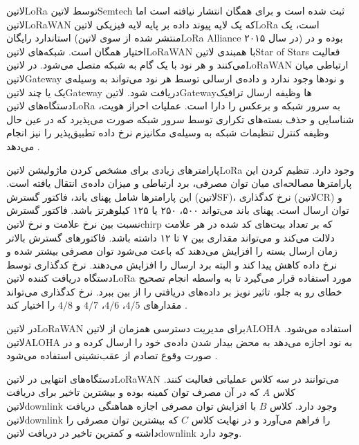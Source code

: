 ‌لاتین{LoRa} توسط ‌لاتین{Semtech} ثبت شده است و برای همگان انتشار نیافته است اما ‌لاتین{LoRaWAN} که یک لایه پیوند داده بر پایه لایه فیزیکی ‌لاتین{LoRa}
است، یک استاندارد رایگان (منتشر شده از سوی ‌لاتین{LoRa Alliance} در سال ۲۰۱۵) بوده و در اختیار همگان است.
شبکه‌های ‌لاتین{LoRaWAN} با همبندی ‌لاتین{Star of Stars} فعالیت می‌کنند و هر نود با یک گام به شبکه متصل می‌شود.
در ‌لاتین{LoRaWAN} ارتباطی میان ‌لاتین{Gateway} و نودها وجود ندارد و داده‌ی ارسالی توسط هر نود می‌تواند به وسیله‌ی یک یا چند ‌لاتین{Gateway} دریافت شود.
‌لاتین{Gateway}ها وظیفه ارسال ترافیک دستگاه‌های ‌لاتین{LoRa} به سرور شبکه و برعکس را دارا است.
عملیات احراز هویت، شناسایی و حذف بسته‌های تکراری توسط سرور شبکه صورت می‌پذیرد که در عین حال وظیفه کنترل
تنظیمات شبکه به وسیله‌ی مکانیزم نرخ داده تطبیق‌پذیر را نیز انجام می‌دهد .

پارامترهای زیادی برای مشخص کردن ماژولیشن ‌لاتین{LoRa} وجود دارد. تنظیم کردن این پارامترها
مصالحه‌ای میان توان مصرفی، برد ارتباطی و میزان داده‌ی انتقال یافته است.
این پارامترها شامل پهنای باند، فاکتور گسترش (‌لاتین{SF})، نرخ کدگذاری (‌لاتین{CR}) و توان ارسال است.
پهنای باند می‌تواند ۵۰۰، ۲۵۰ یا ۱۲۵ کیلوهرتز باشد.
فاکتور گسترش نسبت بین نرخ علامت و نرخ ‌لاتین{chirp} که بر تعداد بیت‌های کد شده در هر علامت دلالت می‌کند و می‌تواند مقداری بین ۷ تا ۱۲ داشته باشد.
فاکتورهای گسترش بالاتر زمان ارسال بسته را افزایش می‌دهند که باعث می‌شود توان مصرفی بیشتر شده و نرخ داده کاهش پیدا کند و البته برد ارسال را افزایش می‌دهند.
نرخ کدگذاری توسط دستگاه دریافت کننده ‌لاتین{LoRa} مورد استفاده قرار می‌گیرد تا به واسطه انجام تصحیح خطای رو به جلو، تاثیر نویز بر داده‌های دریافتی را از بین ببرد.
نرخ کدگذاری می‌تواند مقدارهای $4/5$، $4/6$، $4/7$ و $4/8$ را اختیار کند
.

در ‌لاتین{LoRaWAN} برای مدیریت دسترسی همزمان از ‌لاتین{ALOHA} استفاده می‌شود.
‌لاتین{ALOHA} به نود اجازه می‌دهد به محض بیدار شدن داده‌ی خود را ارسال کرده و در صورت وقوع تصادم
از عقب‌نشینی استفاده می‌شود
.

دستگاه‌های انتهایی در ‌لاتین{LoRaWAN} می‌توانند در سه کلاس عملیاتی فعالیت کنند. کلاس $A$ که در آن مصرف توان کمینه بوده و بیشترین تاخیر
برای دریافت ‌لاتین{downlink} وجود دارد. کلاس $B$ با افزایش توان مصرفی اجازه هماهنگی دریافت ‌لاتین{downlink} را فراهم می‌آورد
و در نهایت کلاس $C$ که بیشترین توان مصرفی را داشته و کمترین تاخیر در دریافت ‌لاتین{downlink} وجود دارد.

